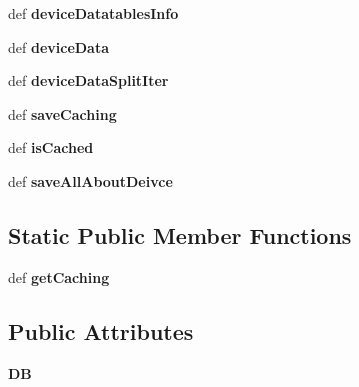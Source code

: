 \begin{DoxyCompactItemize}
def {\bfseries device\+Datatables\+Info}
\item 
\mbox{\label{classMIS_1_1DatabaseTool_1_1onlineReader_1_1Cormis__DataReader__online_aedb02efe95e4e80f8dd1816b2733f755}} 
def {\bfseries device\+Data}
\item 
\mbox{\label{classMIS_1_1DatabaseTool_1_1onlineReader_1_1Cormis__DataReader__online_ae37e44006e741590aadb61f2e5a144f9}} 
def {\bfseries device\+Data\+Split\+Iter}
\item 
\mbox{\label{classMIS_1_1DatabaseTool_1_1onlineReader_1_1Cormis__DataReader__online_a6e2ff424f66712c2112217b2a8d6408e}} 
def {\bfseries save\+Caching}
\item 
\mbox{\label{classMIS_1_1DatabaseTool_1_1onlineReader_1_1Cormis__DataReader__online_a27d0f452698d59155d4cb9830a0a57ab}} 
def {\bfseries is\+Cached}
\item 
\mbox{\label{classMIS_1_1DatabaseTool_1_1onlineReader_1_1Cormis__DataReader__online_a93fad4bfe72dbb177ab01b609d0b79f0}} 
def {\bfseries save\+All\+About\+Deivce}
\end{DoxyCompactItemize}
\subsection*{Static Public Member Functions}
\begin{DoxyCompactItemize}
\item 
\mbox{\label{classMIS_1_1DatabaseTool_1_1onlineReader_1_1Cormis__DataReader__online_aa7c41812458de45d9e6e1dcacf0fcefb}} 
def {\bfseries get\+Caching}
\end{DoxyCompactItemize}
\subsection*{Public Attributes}
\begin{DoxyCompactItemize}
\item 
\mbox{\label{classMIS_1_1DatabaseTool_1_1onlineReader_1_1Cormis__DataReader__online_aaa05e32b9f43ac5bddae27116f53edce}} 
{\bfseries DB}
\end{DoxyCompactItemize}


